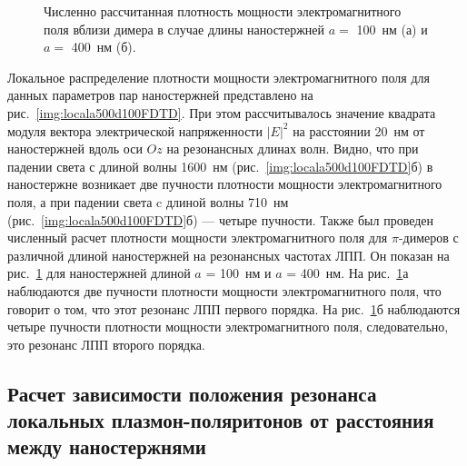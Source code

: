 \begin{figure}
\caption{Численно рассчитанная плотность мощности электромагнитного поля вблизи димера в случае длины наностержней $ a = $ 100~нм (а) и $ a = $ 400~нм (б).}
\label{img:localfield2}
\end{figure}

Локальное распределение плотности мощности электромагнитного поля для данных параметров пар наностержней представлено на рис.~\ref{img:locala500d100FDTD}. При этом рассчитывалось значение квадрата модуля вектора электрической напряженности $ \lvert E \rvert ^2 $ на расстоянии 20~нм от наностержней вдоль оси $ Oz $ на резонансных длинах волн. Видно, что при падении света с длиной волны 1600~нм (рис.~\ref{img:locala500d100FDTD}б) в наностержне возникает две пучности плотности мощности электромагнитного поля, а при падении света c длиной волны 710~нм (рис.~\ref{img:locala500d100FDTD}б) --- четыре пучности. Также был проведен численный расчет плотности мощности электромагнитного поля для $ \pi $-димеров с различной длиной наностержней на резонансных частотах ЛПП. Он показан на рис.~\ref{img:localfield2} для наностержней длиной $ a $ = 100~нм и $ a $ = 400~нм. На рис.~\ref{img:localfield2}а наблюдаются две пучности плотности мощности электромагнитного поля, что говорит о том, что этот резонанс ЛПП первого порядка. На рис.~\ref{img:localfield2}б наблюдаются четыре пучности плотности мощности электромагнитного поля, следовательно, это резонанс ЛПП второго порядка.


\subsection{Расчет зависимости положения резонанса локальных плазмон-по\-ля\-ри\-то\-нов от расстояния между наностержнями}

